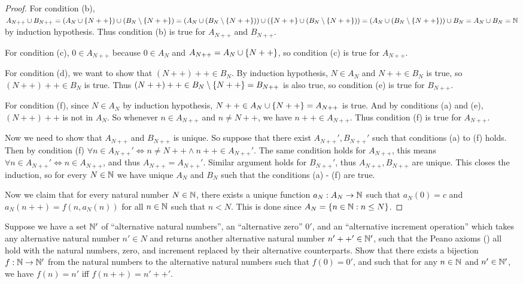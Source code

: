 \begin{proof}
	For condition (b), \(A_{N++} \cup B_{N++} = (A_N \cup \left\lbrace N++\right\rbrace) \cup (B_N \setminus \left\lbrace N++\right\rbrace) = (A_N \cup (B_N \setminus \left\lbrace N++\right\rbrace)) \cup (\left\lbrace N++\right\rbrace \cup (B_N \setminus \left\lbrace N++\right\rbrace)) = (A_N \cup (B_N \setminus \left\lbrace N++\right\rbrace)) \cup B_N = A_N \cup B_N = \mathbb{N}\) by induction hypothesis.
	Thus condition (b) is true for \(A_{N++}\) and \(B_{N++}\).

	For condition (c), \(0 \in A_{N++}\) because \(0 \in A_N\) and \(A_{N++} = A_N \cup \left\lbrace N++\right\rbrace\), so condition (c) is true for \(A_{N++}\).

	For condition (d), we want to show that \((N++)++ \in B_N\).
	By induction hypothesis, \(N \in A_N\) and \(N++ \in B_N\) is true, so \((N++)++ \in B_N\) is true.
	Thus \((N++)++ \in B_N \setminus \left\lbrace N++\right\rbrace = B_{N++}\) is also true, so condition (e) is true for \(B_{N++}\).

	For condition (f), since \(N \in A_N\) by induction hypothesis, \(N++ \in A_N \cup \left\lbrace N++\right\rbrace = A_{N++}\) is true.
	And by conditions (a) and (e), \((N++)++\) is not in \(A_N\).
	So whenever \(n \in A_{N++}\) and \(n \neq N++\), we have \(n++ \in A_{N++}\).
	Thus condition (f) is true for \(A_{N++}\).

	Now we need to show that \(A_{N++}\) and \(B_{N++}\) is unique.
	So suppose that there exist \(A_{N++}', B_{N++}'\) such that conditions (a) to (f) holds.
	Then by condition (f) \(\forall n \in A_{N++}' \iff n \neq N++ \land n++ \in A_{N++}'\).
	The same condition holds for \(A_{N++}\), this means \(\forall n \in A_{N++}' \iff n \in A_{N++}\), and thus \(A_{N++} = A_{N++}'\).
	Similar argument holds for \(B_{N++}'\), thus \(A_{N++}, B_{N++}\) are unique.
	This closes the induction, so for every \(N \in \mathbb{N}\) we have unique \(A_N\) and \(B_N\) such that the conditions (a) - (f) are true.

	Now we claim that for every natural number \(N \in \mathbb{N}\), there exists a unique function \(a_N : A_N \to \mathbb{N}\) such that \(a_N(0) = c\) and \(a_N(n++) = f(n, a_{N}(n))\) for all \(n \in \mathbb{N}\) such that \(n < N\).
	This is done since \(A_N = \left\lbrace n \in \mathbb{N} : n \leq N\right\rbrace\).
\end{proof}

\begin{ex}\label{ex:3.5.13}
	Suppose we have a set \(\mathbb{N}'\) of ``alternative natural numbers'', an ``alternative zero'' \(0'\), and an ``alternative increment operation'' which takes any alternative natural number \(n' \in N\) and returns another alternative natural number \(n'++' \in \mathbb{N}'\), such that the Peano axioms () all hold with the natural numbers, zero, and increment replaced by their alternative counterparts.
	Show that there exists a bijection \(f : \mathbb{N} \to \mathbb{N}'\) from the natural numbers to the alternative natural numbers such that \(f(0) = 0'\), and such that for any \(n \in \mathbb{N}\) and \(n' \in \mathbb{N}'\), we have \(f(n) = n'\) iff \(f(n++) = n'++'\).
\end{ex}

